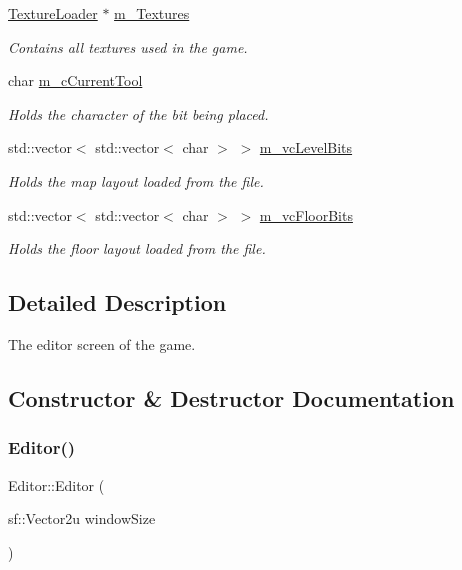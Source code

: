 \begin{DoxyCompactItemize}
\hyperlink{class_texture_loader}{Texture\+Loader} $\ast$ \hyperlink{class_editor_aec73fafe4c6cf898013db7e92ca3b458}{m\+\_\+\+Textures}
\begin{DoxyCompactList}\small\item\em Contains all textures used in the game. \end{DoxyCompactList}\item 
char \hyperlink{class_editor_a1aa49f79c1ba5965a2cad825480fb7bd}{m\+\_\+c\+Current\+Tool}
\begin{DoxyCompactList}\small\item\em Holds the character of the bit being placed. \end{DoxyCompactList}\item 
std\+::vector$<$ std\+::vector$<$ char $>$ $>$ \hyperlink{class_editor_addda4c3fc6ec9c70d7f2ac296eab9d28}{m\+\_\+vc\+Level\+Bits}
\begin{DoxyCompactList}\small\item\em Holds the map layout loaded from the file. \end{DoxyCompactList}\item 
std\+::vector$<$ std\+::vector$<$ char $>$ $>$ \hyperlink{class_editor_a8dde685c36a282f371b027737f7459d4}{m\+\_\+vc\+Floor\+Bits}
\begin{DoxyCompactList}\small\item\em Holds the floor layout loaded from the file. \end{DoxyCompactList}\end{DoxyCompactItemize}


\subsection{Detailed Description}
The editor screen of the game. 

\subsection{Constructor \& Destructor Documentation}
\mbox{\label{class_editor_a45bf02bd66bfc07f02036d1bcad60771}} 
\subsubsection{\texorpdfstring{Editor()}{Editor()}}
{\footnotesize\ttfamily Editor\+::\+Editor (\begin{DoxyParamCaption}\item[{sf\+::\+Vector2u}]{window\+Size }\end{DoxyParamCaption})}



